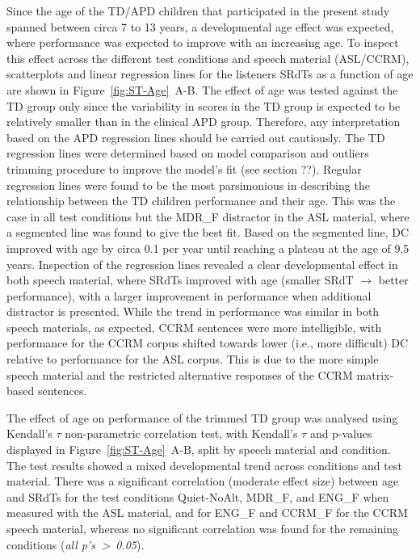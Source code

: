 \documentclass[a4paper, twoside]{templates/ociamthesis}
\begin{document}
Since the age of the TD/APD children that participated in the present study spanned between circa 7 to 13 years, a developmental age effect was expected, where performance was expected to improve with an increasing age. To inspect this effect across the different test conditions and speech material (ASL/CCRM), scatterplots and linear regression lines for the listeners SRdTs as a function of age are shown in Figure~\ref{fig:ST-Age}~A-B. The effect of age was tested against the TD group only since the variability in scores in the TD group is expected to be relatively smaller than in the clinical APD group. Therefore, any interpretation based on the APD regression lines should be carried out cautiously. The TD regression lines were determined based on model comparison and outliers trimming procedure to improve the model's fit (see section ??). Regular regression lines were found to be the most parsimonious in describing the relationship between the TD children performance and their age. This was the case in all test conditions but the MDR\_F distractor in the ASL material, where a segmented line was found to give the best fit. Based on the segmented line, DC improved with age by circa 0.1 per year until reaching a plateau at the age of 9.5 years. Inspection of the regression lines revealed a clear developmental effect in both speech material, where SRdTs improved with age (smaller SRdT \(\rightarrow\) better performance), with a larger improvement in performance when additional distractor is presented. While the trend in performance was similar in both speech materials, as expected, CCRM sentences were more intelligible, with performance for the CCRM corpus shifted towards lower (i.e., more difficult) DC relative to performance for the ASL corpus. This is due to the more simple speech material and the restricted alternative responses of the CCRM matrix-based sentences.

The effect of age on performance of the trimmed TD group was analysed using Kendall's \(\tau\) non-parametric correlation test, with Kendall's \(\tau\) and p-values displayed in Figure~\ref{fig:ST-Age}~A-B, split by speech material and condition. The test results showed a mixed developmental trend across conditions and test material. There was a significant correlation (moderate effect size) between age and SRdTs for the test conditions Quiet-NoAlt, MDR\_F, and ENG\_F when measured with the ASL material, and for ENG\_F and CCRM\_F for the CCRM speech material, whereas no significant correlation was found for the remaining conditions (\emph{all p's~\textgreater~0.05}).
\end{document}

